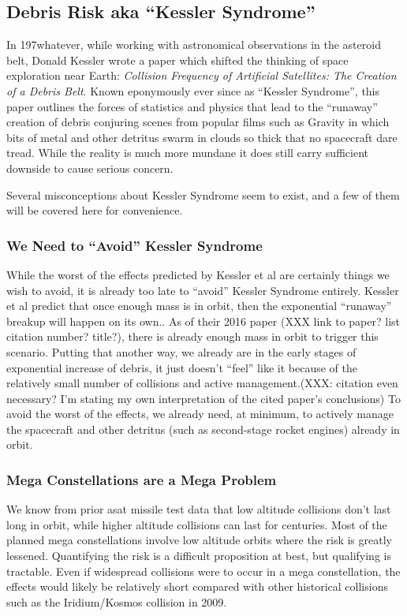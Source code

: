 \subsection{Debris Risk aka ``Kessler Syndrome''}

In 197whatever, while working with astronomical observations in the
asteroid belt, Donald Kessler wrote a paper which shifted the thinking
of space exploration near Earth: {\it Collision Frequency of
  Artificial Satellites: The Creation of a Debris
  Belt}.\cite{kessler-og} Known eponymously ever since as ``Kessler
Syndrome'', this paper outlines the forces of statistics and physics
that lead to the ``runaway'' creation of debris conjuring scenes from
popular films such as Gravity in which bits of metal and other
detritus swarm in clouds so thick that no spacecraft dare tread.
While the reality is much more mundane it does still carry sufficient
downside to cause serious concern.

Several misconceptions about Kessler Syndrome seem to exist, and a few
of them will be covered here for convenience.

\subsubsection{We Need to ``Avoid'' Kessler Syndrome}
While the worst of the effects predicted by Kessler et al are
certainly things we wish to avoid, it is already too late to ``avoid''
Kessler Syndrome entirely.  Kessler et al predict that once enough
mass is in orbit, then the exponential ``runaway'' breakup will happen
on its own.\cite[xxx]{kessler-reunion}.  As of their 2016 paper (XXX
link to paper?  list citation number?  title?), there is already
enough mass in orbit to trigger this
scenario.\cite[xxx]{kessler-reunion} Putting that another way, we
already are in the early stages of exponential increase of debris, it
just doesn't ``feel'' like it because of the relatively small number
of collisions and active management.(XXX: citation even necessary?
I'm stating my own interpretation of the cited paper's conclusions) To
avoid the worst of the effects, we already need, at minimum, to
actively manage the spacecraft and other detritus (such as
second-stage rocket engines) already in
orbit.\cite[xxx]{kessler-reunion}

\subsubsection{Mega Constellations are a Mega Problem}
We know from prior \ac{asat} missile test data that low altitude
collisions don't last long in orbit\cite[shakti analysis
  overview]{xxx}, while higher altitude collisions can last for
centuries.\cite[umm...]{xxx} Most of the planned mega constellations
involve low altitude orbits where the risk is greatly
lessened.\cite[cite my own work maybe?]{xxx} Quantifying the risk is a
difficult proposition at best, but qualifying is tractable.  Even if
widespread collisions were to occur in a mega constellation, the
effects would likely be relatively short compared with other
historical collisions such as the Iridium/Kosmos collision in
2009.\cite[my own youtube video maybe?]{xxx}

